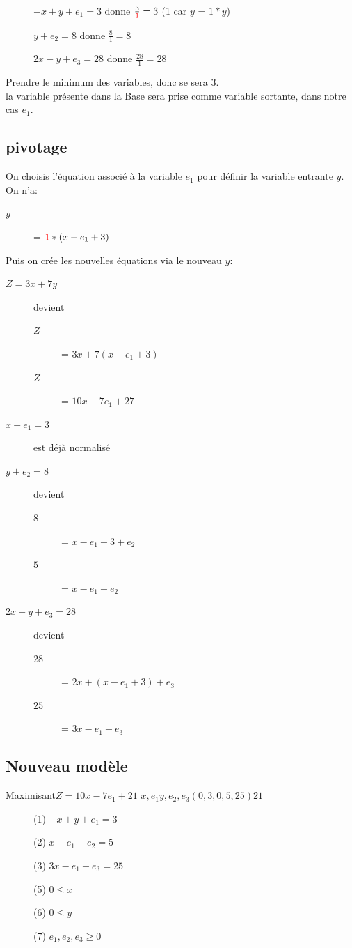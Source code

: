 \begin{description}
\item[] $ -x + y + e_1 = 3$ donne $\frac{3}{\textcolor{red}{1}} = 3$ (1 car $y$ = $1*y$)
\item[] $ y + e_2 = 8$ donne $\frac{8}{1} = 8$
\item[] $ 2x - y + e_3 = 28$ donne $\frac{28}{1} = 28$
\end{description}
Prendre le minimum des variables, donc se sera $3$.\\
la variable présente dans la Base sera prise comme variable sortante, dans notre cas $e_1$.\\
\pagebreak
\subsection{pivotage}
On choisis l'équation associé à la variable $e_1$ pour définir la variable entrante $y$.\\
On n'a:
\begin{description}
\item[$y$] = $\textcolor{red}{1}*(x - e_1 + 3)$
\end{description}

Puis on crée les nouvelles équations via le nouveau $y$:
\begin{description}
\item[$Z = 3x + 7y$] devient
\begin{description}
\item[$Z$] = $3x + 7(x - e_1 + 3)$
\item[$Z$] = $10x - 7e_1 + 27$
\end{description}
\item[$x - e_1 = 3$] est déjà normalisé
\item[$y + e_2 = 8$] devient
\begin{description}
\item[$8$] = $x -e_1 + 3 + e_2$
\item[$5$] = $x - e_1 + e_2$
\end{description}
\item[$2x - y + e_3 = 28$] devient
\begin{description}
\item[$28$] = $2x + (x - e_1 + 3) + e_3$
\item[$25$] = $3x - e_1 + e_3$
\end{description}
\end{description}
\subsection{Nouveau modèle}
        {Maximisant}{$Z = 10x - 7e_1 + 21$}
        {$x,e_1$}{$y,e_2,e_3$}{$(0,3,0,5,25)$}{$21$}
        {\begin{description}
\item[] (1) $-x + y + e_1 = 3$
\item[] (2) $x - e_1 + e_2 = 5$
\item[] (3) $3x - e_1 + e_3 = 25$
\item[] (5) $ 0 \leq x$
\item[] (6) $ 0 \leq y$
\item[] (7) $ e_1,e_2,e_3 \geq 0$
\end{description}
}

